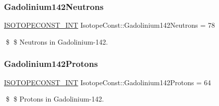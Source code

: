 \subsubsection{\texorpdfstring{Gadolinium142\+Neutrons}{Gadolinium142Neutrons}}
{\footnotesize\ttfamily \mbox{\hyperlink{group___isotope_const-_macros_ga5f18360b3e99483a35c32d789e62621c}{I\+S\+O\+T\+O\+P\+E\+C\+O\+N\+S\+T\+\_\+\+I\+NT}} Isotope\+Const\+::\+Gadolinium142\+Neutrons = 78}

\$ \$ Neutrons in Gadolinium-\/142. \mbox{\label{group___isotope_const-_gadolinium-_gd142_gab40909ba8f7ebab327fd0d47a4fae48f}} 
\subsubsection{\texorpdfstring{Gadolinium142\+Protons}{Gadolinium142Protons}}
{\footnotesize\ttfamily \mbox{\hyperlink{group___isotope_const-_macros_ga5f18360b3e99483a35c32d789e62621c}{I\+S\+O\+T\+O\+P\+E\+C\+O\+N\+S\+T\+\_\+\+I\+NT}} Isotope\+Const\+::\+Gadolinium142\+Protons = 64}

\$ \$ Protons in Gadolinium-\/142. 